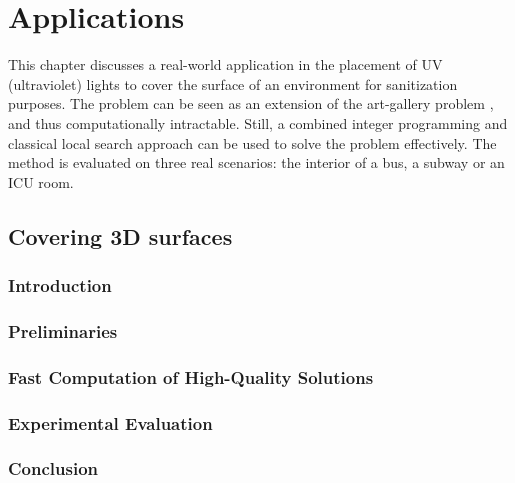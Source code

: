 
\chapter{Applications}
\thispagestyle{myheadings}

This chapter discusses a real-world application in the placement of UV (ultraviolet) lights 
to cover the surface of an environment for sanitization purposes. The problem can be seen as an extension
of the art-gallery problem \cite{o1987art}, and thus computationally intractable.
Still, a combined integer programming and classical local search approach can be used to
solve the problem effectively. The method is evaluated on three real scenarios: 
the interior of a bus, a subway or an ICU room. 

\section{Covering 3D surfaces}

\def\spoc{{\texttt{{SPOC}}}\xspace}
\def\osg{{\texttt{{OSG}}}\xspace}

\subsection{Introduction}

\label{sec:surf-intro}

\subsection{Preliminaries}\label{sec:surf-preliminary}



%

\subsection{Fast Computation of High-Quality Solutions}\label{sec:surf-algorithm}


\subsection{Experimental Evaluation}\label{sec:surf-evaluation}


\vspace{-1mm}
\subsection{Conclusion}\label{sec:surf-conclusion}



